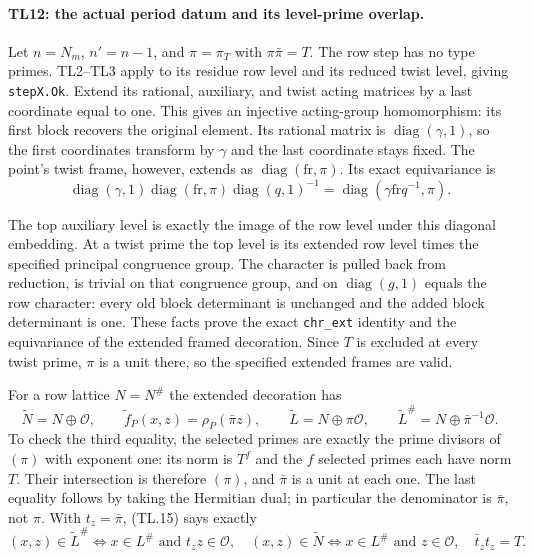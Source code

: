 \documentclass[11pt,a4paper]{article}
\numberwithin{equation}{section}
\theoremstyle{remark}\newtheorem{remark}[theorem]{Remark}
\begin{document}
\paragraph{TL12: the actual period datum and its level-prime overlap.}
Let $n=N_m$, $n'=n-1$, and $\pi=\pi_T$ with
$\pi\bar\pi=T$. The row step has no type primes. TL2--TL3 apply to
its residue row level and its reduced twist level, giving
\texttt{stepX.Ok}. Extend its rational, auxiliary, and twist acting
matrices by a last coordinate equal to one. This gives an
injective acting-group homomorphism: its first block recovers the
original element. Its rational matrix is
$\operatorname{diag}(\gamma,1)$, so the first coordinates transform
by $\gamma$ and the last coordinate stays fixed.
The point's twist frame, however, extends as
$\operatorname{diag}(\mathrm{fr},\pi)$. Its exact equivariance is
\[
 \operatorname{diag}(\gamma,1)
 \operatorname{diag}(\mathrm{fr},\pi)
 \operatorname{diag}(q,1)^{-1}
 =\operatorname{diag}(\gamma\mathrm{fr}q^{-1},\pi).
\]

The top auxiliary level is exactly the image of the row level under
this diagonal embedding. At a twist prime the top level is its
extended row level times the specified principal congruence group.
The character is pulled back from reduction, is trivial on that
congruence group, and on $\operatorname{diag}(g,1)$ equals the row
character: every old block determinant is unchanged and the added
block determinant is one. These facts prove the exact
\texttt{chr\_\allowbreak ext} identity and the equivariance of the extended
framed decoration. Since $T$ is excluded at every twist prime,
$\pi$ is a unit there, so the specified extended frames are valid.

For a row lattice $N=N^\#$ the extended decoration has
\[
 \widetilde N=N\oplus\mathcal O,\qquad
 \widetilde f_P(x,z)=\rho_P(\bar\pi z),\qquad
 \widetilde L=N\oplus\pi\mathcal O,
 \qquad\widetilde L^\#=N\oplus\bar\pi^{-1}\mathcal O.
 \tag{TL.15}
\]
To check the third equality, the selected primes are exactly the
prime divisors of $(\pi)$ with exponent one: its norm is $T^f$ and
the $f$ selected primes each have norm $T$. Their intersection is
therefore $(\pi)$, and $\bar\pi$ is a unit at each one. The last
equality follows by taking the Hermitian dual; in particular the
denominator is $\bar\pi$, not $\pi$.
With $t_z=\bar\pi$, (TL.15) says exactly
\[
 (x,z)\in\widetilde L^\#\iff x\in L^\#\text{ and }t_zz\in\mathcal O,
 \quad (x,z)\in\widetilde N\iff x\in L^\#\text{ and }z\in\mathcal O,
 \quad \bar t_z t_z=T.                            \tag{TL.16}
\]
\end{document}
